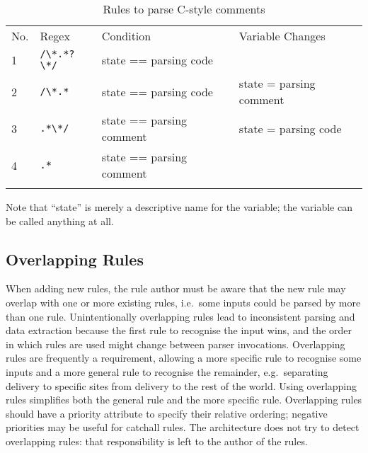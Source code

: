 \begin{table}[thbp]
    \caption{Rules to parse C-style comments}
    \empty{}\label{Rules to parse C-style comments}
    \begin{tabular}{llll}
        \tabletopline{}%
        No.   & Regex             & Condition                 & Variable Changes          \\
        \tablemiddleline{}%
        1     & \verb!/\*.*?\*/!  & state == parsing code     &                           \\
        2     & \verb!/\*.*!      & state == parsing code     & state = parsing comment   \\
        3     & \verb!.*\*/!      & state == parsing comment  & state = parsing code      \\
        4     & \verb!.*!         & state == parsing comment  &                           \\
        \tablebottomline{}%
    \end{tabular}

    Note that ``state'' is merely a descriptive name for the variable; the
    variable can be called anything at all.

\end{table}

\subsection{Overlapping Rules}

\label{overlapping rules in architecture}

When adding new rules, the rule author must be aware that the new rule may
overlap with one or more existing rules, i.e.\ some inputs could be parsed
by more than one rule.  Unintentionally overlapping rules lead to
inconsistent parsing and data extraction because the first rule to
recognise the input wins, and the order in which rules are used might
change between parser invocations.  Overlapping rules are frequently a
requirement, allowing a more specific rule to recognise some inputs and a
more general rule to recognise the remainder, e.g.\ separating
 delivery to specific sites from  delivery to
the rest of the world.  Using overlapping rules simplifies both the general
rule and the more specific rule.  Overlapping rules should have a priority
attribute to specify their relative ordering; negative priorities may be
useful for catchall rules.  The architecture does not try to detect
overlapping rules: that responsibility is left to the author of the rules.

